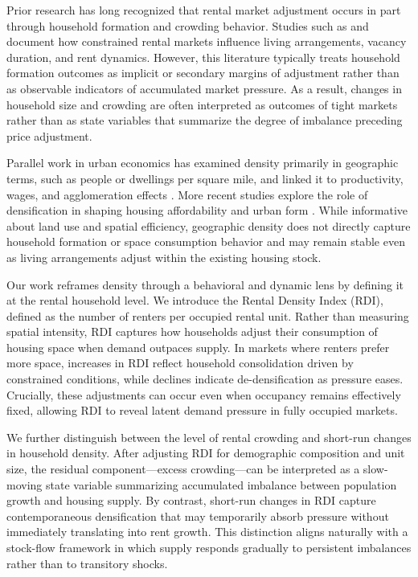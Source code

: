 \documentclass[pdflatex,sn-basic]{sn-jnl}%
\theoremstyle{thmstyleone}%
\theoremstyle{thmstyletwo}%
\theoremstyle{thmstylethree}%
\begin{document}
Prior research has long recognized that rental market adjustment occurs in part through
household formation and crowding behavior. Studies such as \cite{gabriel2001rental}
and \cite{sirmans1991determinants} document how constrained rental markets influence
living arrangements, vacancy duration, and rent dynamics. However, this literature
typically treats household formation outcomes as implicit or secondary margins of
adjustment rather than as observable indicators of accumulated market pressure. As a
result, changes in household size and crowding are often interpreted as outcomes of
tight markets rather than as state variables that summarize the degree of imbalance
preceding price adjustment.

Parallel work in urban economics has examined density primarily in geographic terms,
such as people or dwellings per square mile, and linked it to productivity, wages, and
agglomeration effects \cite{glaeser2001cities, duranton2004micro}. More recent studies
explore the role of densification in shaping housing affordability and urban form
\cite{ahlfeldt2019economic, albouy2015driving}. While informative about land use and
spatial efficiency, geographic density does not directly capture household formation or
space consumption behavior and may remain stable even as living arrangements adjust
within the existing housing stock.

Our work reframes density through a behavioral and dynamic lens by defining it at the
rental household level. We introduce the Rental Density Index (RDI), defined as the
number of renters per occupied rental unit. Rather than measuring spatial intensity, RDI
captures how households adjust their consumption of housing space when demand
outpaces supply. In markets where renters prefer more space, increases in RDI reflect
household consolidation driven by constrained conditions, while declines indicate
de-densification as pressure eases. Crucially, these adjustments can occur even when
occupancy remains effectively fixed, allowing RDI to reveal latent demand pressure in
fully occupied markets.

We further distinguish between the level of rental crowding and short-run changes in
household density. After adjusting RDI for demographic composition and unit size, the
residual component—excess crowding—can be interpreted as a slow-moving state
variable summarizing accumulated imbalance between population growth and housing
supply. By contrast, short-run changes in RDI capture contemporaneous densification
that may temporarily absorb pressure without immediately translating into rent growth.
This distinction aligns naturally with a stock-flow framework in which supply responds
gradually to persistent imbalances rather than to transitory shocks.
\end{document}
